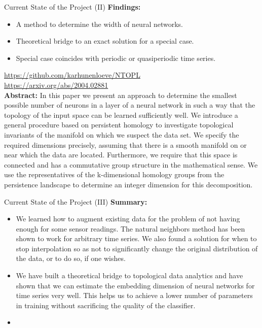 \documentclass[aspectratio=169,t]{beamer}
\begin{document}
  { 
    \begin{frame}{Current State of the Project (II)}
    \textbf{Findings:}
    \begin{itemize}[noitemsep]
      \item A method to determine the width of neural networks.
      \item Theoretical bridge to an exact solution for a special case.
      \item Special case coincides with periodic or quasiperiodic time series.
    \end{itemize}

    \faGithub \; \href{https://github.com/karhunenloeve/NTOPL}{https://github.com/karhunenloeve/NTOPL} \\
    \faFilePdfO \; \href{https://arxiv.org/abs/2004.02881}{https://arxiv.org/abs/2004.02881}\\[0.5cm]

    \textbf{Abstract:} In this paper we present an approach to determine the smallest possible number of neurons in a layer of a neural network in such a way that the topology of the input space can be learned sufficiently well. We introduce a general procedure based on persistent homology to investigate topological invariants of the manifold on which we suspect the data set. We specify the required dimensions precisely, assuming that there is a smooth manifold on or near which the data are located. Furthermore, we require that this space is connected and has a commutative group structure in the mathematical sense. We use the representatives of the k-dimensional homology groups from the persistence landscape to determine an integer dimension for this decomposition.
    \end{frame}
  }

  { 
    \begin{frame}{Current State of the Project (III)}
    \textbf{Summary:}
    \begin{itemize}
      \item We learned how to augment existing data for the problem of not having enough for some sensor readings. The natural neighbors method has been shown to work for arbitrary time series. We also found a solution for when to stop interpolation so as not to significantly change the original distribution of the data, or to do so, if one wishes.
      \item We have built a theoretical bridge to topological data analytics and have shown that we can estimate the embedding dimension of neural networks for time series very well. This helps us to achieve a lower number of parameters in training without sacrificing the quality of the classifier.
      \item 
    \end{itemize}
    \end{frame}
  }
\end{document}
